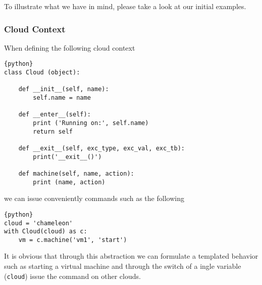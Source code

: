 To illustrate what we have in mind, please take a look at our initial
examples.

\subsubsection{Cloud Context}

When defining the following cloud context 

\begin{lstlisting}{python}
class Cloud (object):
    
    def __init__(self, name):
        self.name = name

    def __enter__(self):
        print ('Running on:', self.name)
        return self

    def __exit__(self, exc_type, exc_val, exc_tb):
        print('__exit__()')

    def machine(self, name, action):
        print (name, action)
\end{lstlisting}

we can issue conveniently commands such as the following 

\begin{lstlisting}{python}
cloud = 'chameleon'
with Cloud(cloud) as c:
    vm = c.machine('vm1', 'start')
\end{lstlisting}

It is obvious that through this abstraction we can formulate a
templated behavior such as starting a virtual machine and through the
switch of a ingle variable (\verb|cloud|) issue the command on other
clouds.


